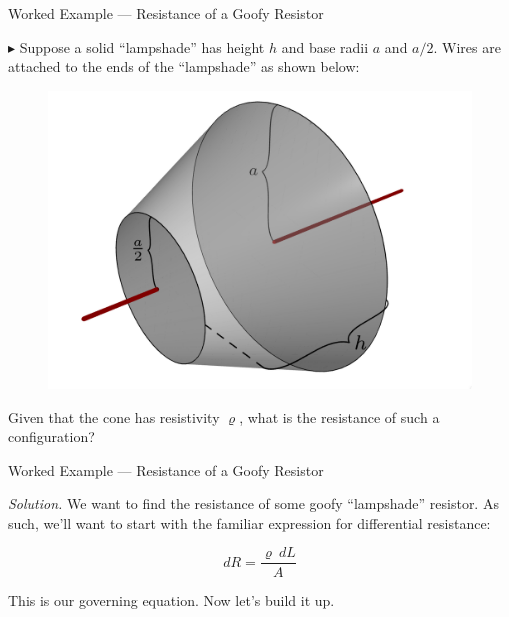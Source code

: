 \documentclass{beamer}
\begin{document}
\begin{frame}{Worked Example --- Resistance of a Goofy Resistor}

$\blacktriangleright$ Suppose a solid ``lampshade'' has height $h$ and base radii $a$ and $a/2$. Wires are attached to the ends of the ``lampshade'' as shown below:

\begin{figure}[H]
\centering
\includegraphics[height=0.5\textheight]{figures/half.png}
\end{figure}

Given that the cone has resistivity $\varrho$, what is the resistance of such a configuration?

\end{frame}

\begin{frame}{Worked Example --- Resistance of a Goofy Resistor}

\textit{Solution.} We want to find the resistance of some goofy ``lampshade'' resistor. As such, we'll want to start with the familiar expression for differential resistance:

\begin{equation*}
    dR = \frac{\varrho\ dL}{A}
\end{equation*}

This is our governing equation. Now let's build it up.

\end{frame}
\end{document}
